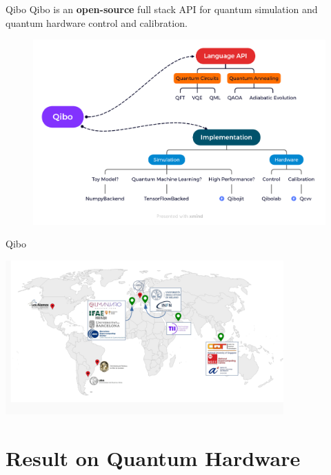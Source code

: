 \documentclass[11pt,aspectratio=169]{beamer}
\begin{document}
\begin{frame}{Qibo}
    Qibo is an \textbf{open-source} full stack API for quantum simulation and quantum hardware control and calibration.
    \begin{figure}
        \includegraphics[width= \textwidth]{figures/Qibo.png}
    \end{figure}
\end{frame}

\begin{frame}{Qibo}

        \includegraphics[width= 0.8\textwidth]{figures/map.png}

        
    
\end{frame}

\section{Result on Quantum Hardware}
\end{document}
